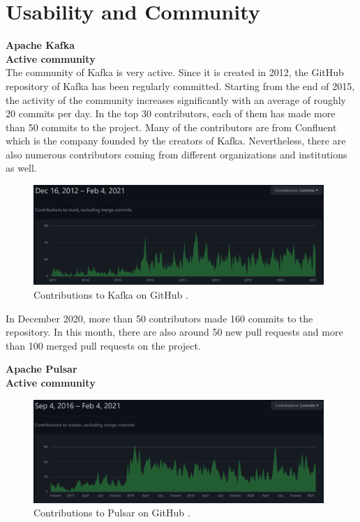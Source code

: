 \section{Usability and Community} \label{section:usability}
\large \textbf{Apache Kafka}\\
\normalsize
\textbf{Active community}\\
The community of Kafka is very active. Since it is created in 2012, the GitHub repository of Kafka has been regularly committed. Starting from the end of 2015, the activity of the community increases significantly with an average of roughly 20 commits per day. In the top 30 contributors, each of them has made more than 50 commits to the project. Many of the contributors are from Confluent which is the company founded by the creators of Kafka. Nevertheless, there are also numerous contributors coming from different organizations and institutions as well.

\begin{figure}[h]
	\centering
	\includegraphics[width=11cm]{images/community-kafka.png}
	\caption{Contributions to Kafka on GitHub \cite{kafkarepo}.}
	\label{fig:communitykafka}
\end{figure}

In December 2020, more than 50 contributors made 160 commits to the repository. In this month, there are also around 50 new pull requests and more than 100 merged pull requests on the project.

\large \textbf{Apache Pulsar}\\
\normalsize
\textbf{Active community}\\
\begin{figure}[h]
	\centering
	\includegraphics[width=11cm]{images/community-pulsar.png}
	\caption{Contributions to Pulsar on GitHub \cite{pulsarrepo}.}
	\label{fig:communitypulsar}
\end{figure}

